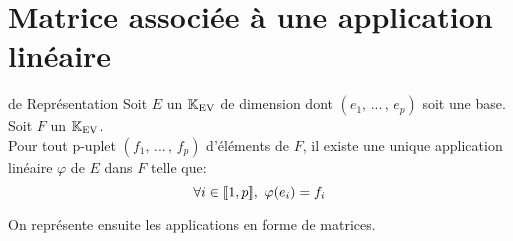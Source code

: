 \documentclass[12pt,twoside,a4paper]{article}
\author{MPSI 2}
\begin{document}
	\maketitle
	\section{Matrice associ\'ee \`a une application lin\'eaire}
		\begin{theo}{de Repr\'esentation}
			Soit $E$ un $\mathbb{K}_\mathrm{EV}$ de dimension dont $(e_1,\,...\,,\,e_p)$ soit une base.\\
			Soit $F$ un $\mathbb{K}_\mathrm{EV}$.\\
			Pour tout p-uplet $(f_1,\,...\,,\,f_p)$ d'\'el\'ements de $F$, il existe une unique application lin\'eaire $\varphi$ de $E$ dans $F$ telle que:
			$$\forall i\in[\![ 1,p ]\!],\ \varphi(e_i)=f_i $$
		\end{theo}
		\begin{flushleft}
			On repr\'esente ensuite les applications en forme de matrices.
		\end{flushleft}
\end{document}
